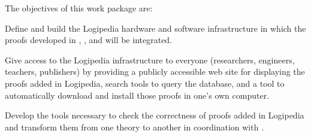 \begin{workpackage}[id=access,type=RTD,wphases=1-48,
  short=Access,%
  title={Access},
  lead=Inr,InrRM=48,OcaRM=6,EduRM=12]

\begin{wpobjectives}
  The objectives of this work package are:
  \begin{compactenum}[(a)]
  \item Define and build the Logipedia hardware and software
    infrastructure in which the proofs developed in
    , ,  and
     will be integrated.
  \item Give access to the Logipedia infrastructure to everyone
    (researchers, engineers, teachers, publishers) by providing a
    publicly accessible web site for displaying the proofs added in
    Logipedia, search tools to query the database, and a tool to
    automatically download and install those proofs in one's own
    computer.
  \item Develop the tools necessary to check the correctness of proofs
    added in Logipedia and transform them from one theory to another
    in coordination with .
  \end{compactenum}
\end{wpobjectives}

\begin{tasklist}

  \newcommand\hide[1]{}
  \hide{
  \begin{task}[id=archi,
      title=Defining the functional and software architecture,
      lead=Inr,InrRM=3,wphases=2-5]
    The logipedia platform will reuse efforts done on an existing
    application. However, with an ambition to be a reference platform
    accessible on internet, it is necessary to meet several
    requirements for such an application, especially scalability,
    availability and sustainability.

    To achieve this goal, we will specify the architecture of the system.
    This will be done by:
    \begin{compactitem}
    \item Collecting and formalizing users needs
    \item Defining the proof submission process
    \item Defining the reuse strategy in term of software components
    \item Defining the global software architecture
    \item Defining how proof files for the different proof systems
      will be organized and stored in logipedia database, based on
      structure defined in \taskref{structuring}{strlibstructure}.
    \end{compactitem}


\end{task}}
\end{tasklist}
\end{workpackage}
